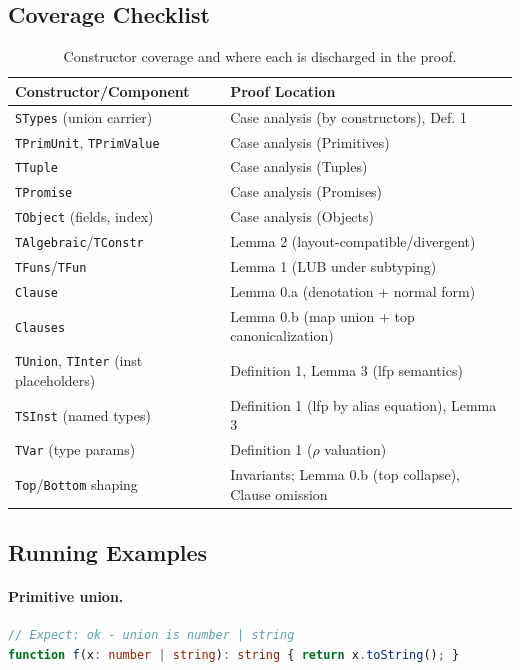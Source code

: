 \documentclass[11pt]{article}
\begin{document}
\subsection*{Coverage Checklist}
\begin{table}[h]
\centering
\begin{tabular}{|l|l|}
\hline
\textbf{Constructor/Component} & \textbf{Proof Location} \\
\hline
\texttt{STypes} (union carrier) & Case analysis (by constructors), Def. 1 \\
\hline
\texttt{TPrimUnit}, \texttt{TPrimValue} & Case analysis (Primitives) \\
\hline
\texttt{TTuple} & Case analysis (Tuples) \\
\hline
\texttt{TPromise} & Case analysis (Promises) \\
\hline
\texttt{TObject} (fields, index) & Case analysis (Objects) \\
\hline
\texttt{TAlgebraic}/\texttt{TConstr} & Lemma 2 (layout-compatible/divergent) \\
\hline
\texttt{TFuns}/\texttt{TFun} & Lemma 1 (LUB under subtyping) \\
\hline
\texttt{Clause} & Lemma 0.a (denotation + normal form) \\
\hline
\texttt{Clauses} & Lemma 0.b (map union + top canonicalization) \\
\hline
\texttt{TUnion}, \texttt{TInter} (inst placeholders) & Definition 1, Lemma 3 (lfp semantics) \\
\hline
\texttt{TSInst} (named types) & Definition 1 (lfp by alias equation), Lemma 3 \\
\hline
\texttt{TVar} (type params) & Definition 1 ($\rho$ valuation) \\
\hline
\texttt{Top}/\texttt{Bottom} shaping & Invariants; Lemma 0.b (top collapse), Clause omission \\
\hline
\end{tabular}
\caption{Constructor coverage and where each is discharged in the proof.}
\end{table}

\subsection*{Running Examples}
\paragraph{Primitive union.}
\begin{lstlisting}[language=TypeScript]
// Expect: ok - union is number | string
function f(x: number | string): string { return x.toString(); }
\end{lstlisting}
\end{document}
